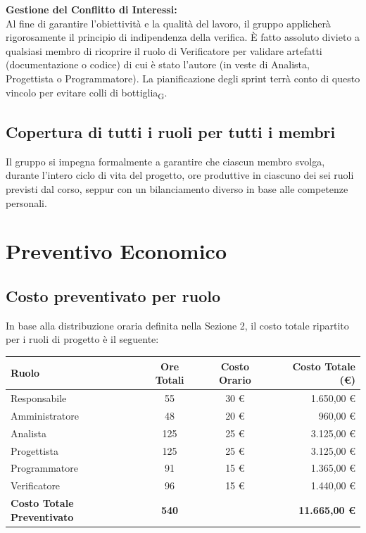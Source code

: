 \documentclass[11pt, a4paper]{article}
\begin{document}
	\textbf{Gestione del Conflitto di Interessi:}\\
	Al fine di garantire l'obiettività e la qualità del lavoro, il gruppo applicherà rigorosamente il principio di indipendenza della verifica. È fatto assoluto divieto a qualsiasi membro di ricoprire il ruolo di Verificatore per validare artefatti (documentazione o codice) di cui è stato l'autore (in veste di Analista, Progettista o Programmatore). La pianificazione degli sprint terrà conto di questo vincolo per evitare colli di bottiglia\textsubscript{G}.
	
	\subsection{Copertura di tutti i ruoli per tutti i membri}
	Il gruppo si impegna formalmente a garantire che ciascun membro svolga, durante l'intero ciclo di vita del progetto, ore produttive in ciascuno dei sei ruoli previsti dal corso, seppur con un bilanciamento diverso in base alle competenze personali.
	
	\newpage
	\section{Preventivo Economico}
	
	\subsection{Costo preventivato per ruolo}
	In base alla distribuzione oraria definita nella Sezione 2, il costo totale ripartito per i ruoli di progetto è il seguente:
	
	\begin{table}[H]
		\centering
		\renewcommand{\arraystretch}{1.3}
		\begin{tabularx}{\textwidth}{|X|c|c|r|}
			\hline
			\rowcolor{primarycolor!10}
			\textbf{Ruolo} & \textbf{Ore Totali} & \textbf{Costo Orario} & \textbf{Costo Totale (\euro)} \\
			\hline
			Responsabile & 55 & 30 \euro & 1.650,00 \euro \\
			\hline
			Amministratore & 48 & 20 \euro & 960,00 \euro \\
			\hline
			Analista & 125 & 25 \euro & 3.125,00 \euro \\
			\hline
			Progettista & 125 & 25 \euro & 3.125,00 \euro \\
			\hline
			Programmatore & 91 & 15 \euro & 1.365,00 \euro \\
			\hline
			Verificatore & 96 & 15 \euro & 1.440,00 \euro \\
			\hline
			\rowcolor{lightgray}
			\textbf{Costo Totale Preventivato} & \textbf{540} & & \textbf{11.665,00 \euro} \\
			\hline
		\end{tabularx}
	\end{table}
	
\end{document}
